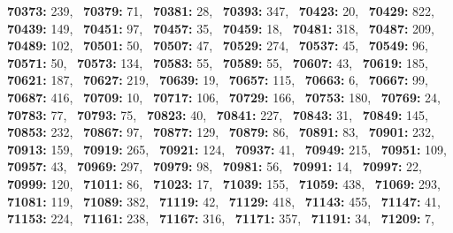 \textbf{70373:} 239,\allowbreak~ 
\textbf{70379:} 71,\allowbreak~ 
\textbf{70381:} 28,\allowbreak~ 
\textbf{70393:} 347,\allowbreak~ 
\textbf{70423:} 20,\allowbreak~ 
\textbf{70429:} 822,\allowbreak~ 
\textbf{70439:} 149,\allowbreak~ 
\textbf{70451:} 97,\allowbreak~ 
\textbf{70457:} 35,\allowbreak~ 
\textbf{70459:} 18,\allowbreak~ 
\textbf{70481:} 318,\allowbreak~ 
\textbf{70487:} 209,\allowbreak~ 
\textbf{70489:} 102,\allowbreak~ 
\textbf{70501:} 50,\allowbreak~ 
\textbf{70507:} 47,\allowbreak~ 
\textbf{70529:} 274,\allowbreak~ 
\textbf{70537:} 45,\allowbreak~ 
\textbf{70549:} 96,\allowbreak~ 
\textbf{70571:} 50,\allowbreak~ 
\textbf{70573:} 134,\allowbreak~ 
\textbf{70583:} 55,\allowbreak~ 
\textbf{70589:} 55,\allowbreak~ 
\textbf{70607:} 43,\allowbreak~ 
\textbf{70619:} 185,\allowbreak~ 
\textbf{70621:} 187,\allowbreak~ 
\textbf{70627:} 219,\allowbreak~ 
\textbf{70639:} 19,\allowbreak~ 
\textbf{70657:} 115,\allowbreak~ 
\textbf{70663:} 6,\allowbreak~ 
\textbf{70667:} 99,\allowbreak~ 
\textbf{70687:} 416,\allowbreak~ 
\textbf{70709:} 10,\allowbreak~ 
\textbf{70717:} 106,\allowbreak~ 
\textbf{70729:} 166,\allowbreak~ 
\textbf{70753:} 180,\allowbreak~ 
\textbf{70769:} 24,\allowbreak~ 
\textbf{70783:} 77,\allowbreak~ 
\textbf{70793:} 75,\allowbreak~ 
\textbf{70823:} 40,\allowbreak~ 
\textbf{70841:} 227,\allowbreak~ 
\textbf{70843:} 31,\allowbreak~ 
\textbf{70849:} 145,\allowbreak~ 
\textbf{70853:} 232,\allowbreak~ 
\textbf{70867:} 97,\allowbreak~ 
\textbf{70877:} 129,\allowbreak~ 
\textbf{70879:} 86,\allowbreak~ 
\textbf{70891:} 83,\allowbreak~ 
\textbf{70901:} 232,\allowbreak~ 
\textbf{70913:} 159,\allowbreak~ 
\textbf{70919:} 265,\allowbreak~ 
\textbf{70921:} 124,\allowbreak~ 
\textbf{70937:} 41,\allowbreak~ 
\textbf{70949:} 215,\allowbreak~ 
\textbf{70951:} 109,\allowbreak~ 
\textbf{70957:} 43,\allowbreak~ 
\textbf{70969:} 297,\allowbreak~ 
\textbf{70979:} 98,\allowbreak~ 
\textbf{70981:} 56,\allowbreak~ 
\textbf{70991:} 14,\allowbreak~ 
\textbf{70997:} 22,\allowbreak~ 
\textbf{70999:} 120,\allowbreak~ 
\textbf{71011:} 86,\allowbreak~ 
\textbf{71023:} 17,\allowbreak~ 
\textbf{71039:} 155,\allowbreak~ 
\textbf{71059:} 438,\allowbreak~ 
\textbf{71069:} 293,\allowbreak~ 
\textbf{71081:} 119,\allowbreak~ 
\textbf{71089:} 382,\allowbreak~ 
\textbf{71119:} 42,\allowbreak~ 
\textbf{71129:} 418,\allowbreak~ 
\textbf{71143:} 455,\allowbreak~ 
\textbf{71147:} 41,\allowbreak~ 
\textbf{71153:} 224,\allowbreak~ 
\textbf{71161:} 238,\allowbreak~ 
\textbf{71167:} 316,\allowbreak~ 
\textbf{71171:} 357,\allowbreak~ 
\textbf{71191:} 34,\allowbreak~ 
\textbf{71209:} 7,\allowbreak~ 
